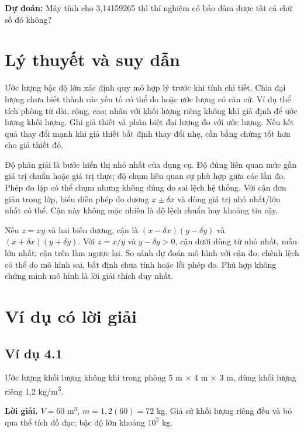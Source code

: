 \documentclass[11pt,a4paper,openany]{book}
\begin{document}
\textbf{Dự đoán:} Máy tính cho 3,14159265 thì thí nghiệm có bảo đảm được tất cả chữ số đó không?
\section{Lý thuyết và suy dẫn}
Ước lượng bậc độ lớn xác định quy mô hợp lý trước khi tính chi tiết. Chia đại lượng chưa biết thành các yếu tố có thể đo hoặc ước lượng có căn cứ. Ví dụ thể tích phòng từ dài, rộng, cao; nhân với khối lượng riêng không khí giả định để ước lượng khối lượng. Ghi giả thiết và phân biệt đại lượng đo với ước lượng. Nếu kết quả thay đổi mạnh khi giả thiết bất định thay đổi nhẹ, cần bằng chứng tốt hơn cho giả thiết đó.

Độ phân giải là bước hiển thị nhỏ nhất của dụng cụ. Độ đúng liên quan mức gần giá trị chuẩn hoặc giá trị thực; độ chụm liên quan sự phù hợp giữa các lần đo. Phép đo lặp có thể chụm nhưng không đúng do sai lệch hệ thống. Với cận đơn giản trong lớp, biểu diễn phép đo dương $x\pm\delta x$ và dùng giá trị nhỏ nhất/lớn nhất có thể. Cận này không mặc nhiên là độ lệch chuẩn hay khoảng tin cậy.

Nếu $z=xy$ và hai biến dương, cận là $(x-\delta x)(y-\delta y)$ và $(x+\delta x)(y+\delta y)$. Với $z=x/y$ và $y-\delta y>0$, cận dưới dùng tử nhỏ nhất, mẫu lớn nhất; cận trên làm ngược lại. So sánh dự đoán mô hình với cận đo; chênh lệch có thể do mô hình sai, bất định chưa tính hoặc lỗi phép đo. Phù hợp không chứng minh mô hình là lời giải thích duy nhất.
\begin{center}
\end{center}
\section{Ví dụ có lời giải}
\subsection*{Ví dụ 4.1}
Ước lượng khối lượng không khí trong phòng 5 m \ensuremath{\times} 4 m \ensuremath{\times} 3 m, dùng khối lượng riêng 1,2 kg/m\textsuperscript{3}.

\textbf{Lời giải.} $V=60$ m$^3$, $m=1{,}2(60)=72$ kg. Giả sử khối lượng riêng đều và bỏ qua thể tích đồ đạc; bậc độ lớn khoảng $10^2$ kg.
\end{document}
